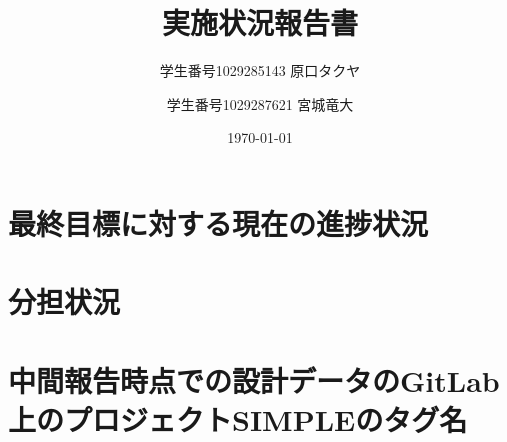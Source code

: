 \documentclass{jsreport}
\title{実施状況報告書}
\author{学生番号1029285143 原口タクヤ \and 学生番号1029287621 宮城竜大}
\date{\today}
\begin{document}
\maketitle
\clearpage

\section{最終目標に対する現在の進捗状況}

\section{分担状況}

\section{中間報告時点での設計データのGitLab上のプロジェクトSIMPLEのタグ名}
\end{document}
